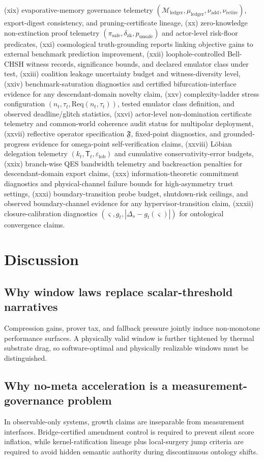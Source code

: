 \documentclass[11pt,a4paper]{article}
\newcommand{\eps}{\varepsilon}
\theoremstyle{definition}
\theoremstyle{remark}
\begin{document}
(xix) evaporative-memory governance telemetry $(\mathcal M_{\mathrm{ledger}},\mu_{\mathrm{ledger}},\nu_{\mathrm{add}},\nu_{\mathrm{retire}})$, export-digest consistency, and pruning-certificate lineage,
(xx) zero-knowledge non-extinction proof telemetry $(\pi_{\mathrm{safe}},\delta_{\mathrm{zk}},p_{\mathrm{unsafe}})$ and actor-level risk-floor predicates,
(xxi) cosmological truth-grounding reports linking objective gains to external benchmark prediction improvement,
(xxii) loophole-controlled Bell-CHSH witness records, significance bounds, and declared emulator class under test,
(xxiii) coalition leakage uncertainty budget and witness-diversity level,
(xxiv) benchmark-saturation diagnostics and certified bifurcation-interface evidence for any descendant-domain novelty claim,
(xxv) complexity-ladder stress configuration $(n_t,\tau_t,\mathrm{Req}(n_t,\tau_t))$, tested emulator class definition, and observed deadline/glitch statistics,
(xxvi) actor-level non-domination certificate telemetry and common-world coherence audit status for multipolar deployment,
(xxvii) reflective operator specification $\mathfrak F$, fixed-point diagnostics, and grounded-progress evidence for omega-point self-verification claims,
(xxviii) L\"obian delegation telemetry $(k_t,\mathsf T_t,\eps_{\mathrm{lob}})$ and cumulative conservativity-error budgets,
(xxix) branch-wise QES bandwidth telemetry and backreaction penalties for descendant-domain export claims,
(xxx) information-theoretic commitment diagnostics and physical-channel failure bounds for high-asymmetry trust settings,
(xxxi) boundary-transition probe budget, shutdown-risk ceilings, and observed boundary-channel evidence for any hypervisor-transition claim,
(xxxii) closure-calibration diagnostics $(\varsigma,g_t,|\Delta_s-g_t(\varsigma)|)$ for ontological convergence claims.

\section{Discussion}
\subsection{Why window laws replace scalar-threshold narratives}
Compression gains, prover tax, and fallback pressure jointly induce non-monotone performance surfaces.
A physically valid window is further tightened by thermal substrate drag, so software-optimal and physically realizable windows must be distinguished.

\subsection{Why no-meta acceleration is a measurement-governance problem}
In observable-only systems, growth claims are inseparable from measurement interfaces.
Bridge-certified amendment control is required to prevent silent score inflation, while kernel-ratification lineage plus local-surgery jump criteria are required to avoid hidden semantic authority during discontinuous ontology shifts.
\end{document}
